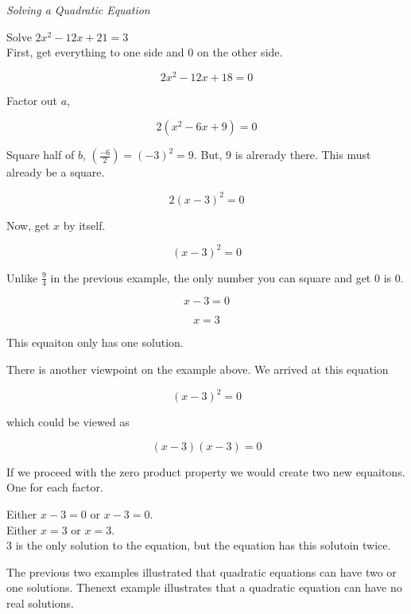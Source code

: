 \documentclass{ximera}
\begin{document}
\begin{example} \textit{Solving a Quadratic Equation}

Solve $2 x^2 - 12x + 21 = 3$ \\


First, get everything to one side and $0$ on the other side.



\[  2 x^2 - 12x + 18 = 0  \]

Factor out $a$,

\[  2 (x^2 - 6x + 9) = 0  \]


Square half of $b$, $\left(\frac{-6}{2}\right) = (-3)^2 = 9$.  But, $9$ is alrerady there.  This must already be a square.



\[  2 (x - 3)^2 = 0  \]


Now, get $x$ by itself.

\[  (x - 3)^2 = 0  \]


Unlike $\frac{9}{4}$ in the previous example, the only number you can square and get $0$ is $0$.

\[  x - 3 = 0  \]

\[  x = 3  \]


This equaiton only has one solution.



\end{example}




There is another viewpoint on the example above.  We arrived at this equation

\[  (x - 3)^2 = 0  \]

which could be viewed as 

\[  (x - 3) (x - 3) = 0  \]


If we proceed with the zero product property we would create two new equaitons.  One for each factor.

Either $x - 3 = 0$   or $x - 3 = 0$. \\

Either $x = 3$ or $x = 3$.  \\

$3$ is the only solution to the equation, but the equation has this solutoin twice.


The previous two examples illustrated that quadratic equations can have two or one solutions.  Thenext example illustrates that a quadratic equation can have no real solutions.
\end{document}
